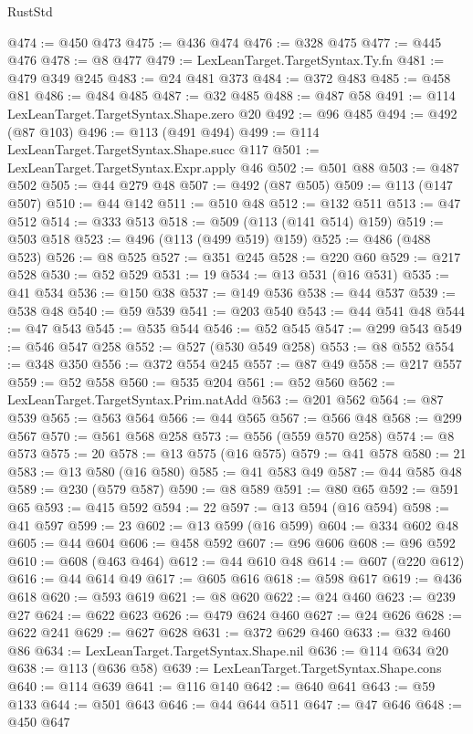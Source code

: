 \begin{lexlean}{RustStd}
\begin{coremodule}
@474 := @450 @473
@475 := @436 @474
@476 := @328 @475
@477 := @445 @476
@478 := @8 @477
@479 := LexLeanTarget.TargetSyntax.Ty.fn
@481 := @479 @349 @245
@483 := @24 @481 @373
@484 := @372 @483
@485 := @458 @81
@486 := @484 @485
@487 := @32 @485
@488 := @487 @58
@491 := @114 LexLeanTarget.TargetSyntax.Shape.zero @20
@492 := @96 @485
@494 := @492 (@87 @103)
@496 := @113 (@491 @494)
@499 := @114 LexLeanTarget.TargetSyntax.Shape.succ @117
@501 := LexLeanTarget.TargetSyntax.Expr.apply @46
@502 := @501 @88
@503 := @487 @502
@505 := @44 @279 @48
@507 := @492 (@87 @505)
@509 := @113 (@147 @507)
@510 := @44 @142
@511 := @510 @48
@512 := @132 @511
@513 := @47 @512
@514 := @333 @513
@518 := @509 (@113 (@141 @514) @159)
@519 := @503 @518
@523 := @496 (@113 (@499 @519) @159)
@525 := @486 (@488 @523)
@526 := @8 @525
@527 := @351 @245
@528 := @220 @60
@529 := @217 @528
@530 := @52 @529
@531 := 19
@534 := @13 @531 (@16 @531)
@535 := @41 @534
@536 := @150 @38
@537 := @149 @536
@538 := @44 @537
@539 := @538 @48
@540 := @59 @539
@541 := @203 @540
@543 := @44 @541 @48
@544 := @47 @543
@545 := @535 @544
@546 := @52 @545
@547 := @299 @543
@549 := @546 @547 @258
@552 := @527 (@530 @549 @258)
@553 := @8 @552
@554 := @348 @350
@556 := @372 @554 @245
@557 := @87 @49
@558 := @217 @557
@559 := @52 @558
@560 := @535 @204
@561 := @52 @560
@562 := LexLeanTarget.TargetSyntax.Prim.natAdd
@563 := @201 @562
@564 := @87 @539
@565 := @563 @564
@566 := @44 @565
@567 := @566 @48
@568 := @299 @567
@570 := @561 @568 @258
@573 := @556 (@559 @570 @258)
@574 := @8 @573
@575 := 20
@578 := @13 @575 (@16 @575)
@579 := @41 @578
@580 := 21
@583 := @13 @580 (@16 @580)
@585 := @41 @583 @49
@587 := @44 @585 @48
@589 := @230 (@579 @587)
@590 := @8 @589
@591 := @80 @65
@592 := @591 @65
@593 := @415 @592
@594 := 22
@597 := @13 @594 (@16 @594)
@598 := @41 @597
@599 := 23
@602 := @13 @599 (@16 @599)
@604 := @334 @602 @48
@605 := @44 @604
@606 := @458 @592
@607 := @96 @606
@608 := @96 @592
@610 := @608 (@463 @464)
@612 := @44 @610 @48
@614 := @607 (@220 @612)
@616 := @44 @614 @49
@617 := @605 @616
@618 := @598 @617
@619 := @436 @618
@620 := @593 @619
@621 := @8 @620
@622 := @24 @460
@623 := @239 @27
@624 := @622 @623
@626 := @479 @624 @460
@627 := @24 @626
@628 := @622 @241
@629 := @627 @628
@631 := @372 @629 @460
@633 := @32 @460 @86
@634 := LexLeanTarget.TargetSyntax.Shape.nil
@636 := @114 @634 @20
@638 := @113 (@636 @58)
@639 := LexLeanTarget.TargetSyntax.Shape.cons
@640 := @114 @639
@641 := @116 @140
@642 := @640 @641
@643 := @59 @133
@644 := @501 @643
@646 := @44 @644 @511
@647 := @47 @646
@648 := @450 @647

\end{coremodule}
\end{lexlean}
